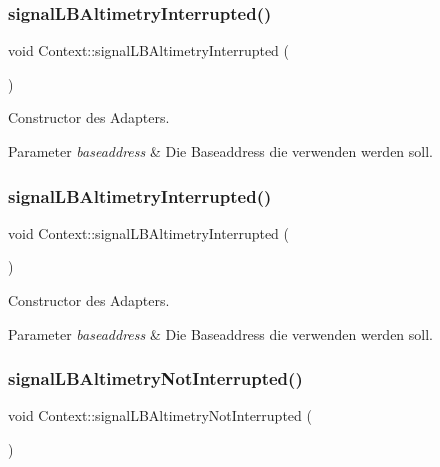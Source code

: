\subsubsection{\texorpdfstring{signal\+L\+B\+Altimetry\+Interrupted()}{signalLBAltimetryInterrupted()}\hspace{0.1cm}{\footnotesize\ttfamily [1/2]}}
{\footnotesize\ttfamily void Context\+::signal\+L\+B\+Altimetry\+Interrupted (\begin{DoxyParamCaption}{ }\end{DoxyParamCaption})}

Constructor des Adapters.


\begin{DoxyParams}{Parameter}
{\em baseaddress} & Die Baseaddress die verwenden werden soll. \\
\hline
\end{DoxyParams}
\hypertarget{class_context_af78ea1902addcf137e8e7d99431592c6}{}\label{class_context_af78ea1902addcf137e8e7d99431592c6} 
\subsubsection{\texorpdfstring{signal\+L\+B\+Altimetry\+Interrupted()}{signalLBAltimetryInterrupted()}\hspace{0.1cm}{\footnotesize\ttfamily [2/2]}}
{\footnotesize\ttfamily void Context\+::signal\+L\+B\+Altimetry\+Interrupted (\begin{DoxyParamCaption}{ }\end{DoxyParamCaption})}

Constructor des Adapters.


\begin{DoxyParams}{Parameter}
{\em baseaddress} & Die Baseaddress die verwenden werden soll. \\
\hline
\end{DoxyParams}
\hypertarget{class_context_acf97db4d70e7246a1d06e4166ece5de5}{}\label{class_context_acf97db4d70e7246a1d06e4166ece5de5} 
\subsubsection{\texorpdfstring{signal\+L\+B\+Altimetry\+Not\+Interrupted()}{signalLBAltimetryNotInterrupted()}\hspace{0.1cm}{\footnotesize\ttfamily [1/2]}}
{\footnotesize\ttfamily void Context\+::signal\+L\+B\+Altimetry\+Not\+Interrupted (\begin{DoxyParamCaption}{ }\end{DoxyParamCaption})}

